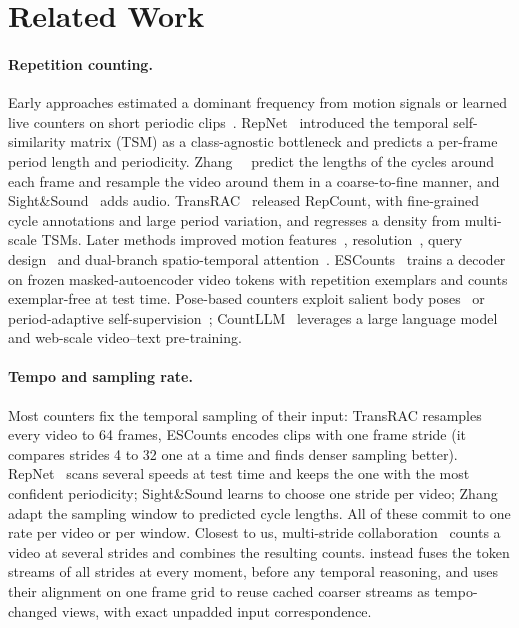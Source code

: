 \section{Related Work}
\label{sec:related}

\paragraph{Repetition counting.}
Early approaches estimated a dominant frequency from motion signals or learned
live counters on short periodic clips~\cite{levy2015live,runia2018realworld}.
RepNet~\cite{dwibedi2020repnet} introduced the temporal self-similarity matrix
(TSM) as a class-agnostic bottleneck and predicts a per-frame period length and
periodicity. Zhang~\etal~\cite{zhang2020context} predict the lengths of the
cycles around each frame and resample the video around them in a coarse-to-fine
manner, and Sight\&Sound~\cite{zhang2021sight} adds audio. TransRAC~\cite{hu2022transrac}
released RepCount, with fine-grained cycle annotations and large period
variation, and regresses a density from multi-scale TSMs. Later methods improved
motion features~\cite{li2024mfl}, resolution~\cite{li2023fullres}, query
design~\cite{ma2026detrc} and dual-branch spatio-temporal
attention~\cite{wang2026d2stx}. ESCounts~\cite{sinha2024escounts} trains a
decoder on frozen masked-autoencoder video tokens with repetition exemplars and
counts exemplar-free at test time. Pose-based counters exploit salient body
poses~\cite{yao2025poserac} or period-adaptive
self-supervision~\cite{gao2026pams}; CountLLM~\cite{yao2025countllm} leverages
a large language model and web-scale video--text pre-training.

\paragraph{Tempo and sampling rate.}
Most counters fix the temporal sampling of their input: TransRAC resamples every
video to 64 frames, ESCounts encodes clips with one frame stride (it compares
strides 4 to 32 one at a time and finds denser sampling better).
RepNet~\cite{dwibedi2020repnet} scans several speeds at test time and keeps the
one with the most confident periodicity; Sight\&Sound learns to choose one
stride per video; Zhang~\etal~\cite{zhang2020context} adapt the sampling window
to predicted cycle lengths. All of these commit to one rate per video or per
window. Closest to us, multi-stride collaboration~\cite{gan2023multistride}
counts a video at several strides and combines the resulting counts. \method
instead fuses the token streams of all strides at every moment, before any
temporal reasoning, and uses their alignment on one frame grid to reuse cached
coarser streams as tempo-changed views, with exact unpadded input correspondence.

